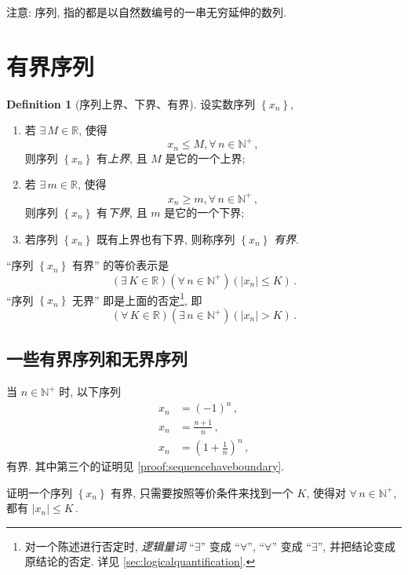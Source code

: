 \documentclass{book}
\newcommand{\Exists}{\exists\,}
\newcommand{\Any}{\forall\,}
\newcommand{\set}[1]{\left\{#1\right\}}
\newcommand{\abs}[1]{\left\lvert #1 \right\rvert}
\newcommand{\R}{\mathbb{R}}
\newcommand{\N}{\mathbb{N}}
\renewcommand{\ge}{\geqslant}
\renewcommand{\le}{\leqslant}
\numberwithin{equation}{section}
\numberwithin{figure}{section}
\theoremstyle{definition}
\newtheorem{definition}{Definition}
\newcommand{\dq}[1]{``#1''}
\begin{document}
注意: 序列, 指的都是以自然数编号的一串无穷延伸的数列.
\section{有界序列}
\begin{definition}[序列上界、下界、有界]
  设实数序列 $\set{x_n}$,
  \begin{enumerate}
    \item 若 $\Exists M\in\R$, 使得
      \begin{equation*}
	x_n\le M,\Any n\in\N^+\,,
      \end{equation*}
      则序列 $\set{x_n}$ 有\emph{上界}, 且 $M$ 是它的一个上界;
    \item 若 $\Exists m\in\R$, 使得
      \begin{equation*}
	x_n\ge m,\Any n\in\N^+\,,
      \end{equation*}
      则序列 $\set{x_n}$ 有\emph{下界}, 且 $m$ 是它的一个下界;
    \item 若序列 $\set{x_n}$ 既有上界也有下界, 则称序列 $\set{x_n}$ \emph{有界}.
  \end{enumerate}
\end{definition}

\dq{序列 $\set{x_n}$ 有界} 的等价表示是
\begin{equation*}
  (\Exists K\in\R)(\Any n\in\N^+)(\abs{x_n}\le K)\,.
\end{equation*}
\dq{序列 $\set{x_n}$ 无界} 即是上面的否定\footnote{对一个陈述进行否定时, \emph{逻辑量词} \dq{$\exists$} 变成 \dq{$\forall$}, \dq{$\forall$} 变成 \dq{$\exists$}, 并把结论变成原结论的否定. 详见 \cref{sec:logicalquantification}.}, 即
\begin{equation*}
  (\Any K\in\R)(\Exists n\in\N^+)(\abs{x_n}>K)\,.
\end{equation*}

\subsection{一些有界序列和无界序列}
\label{sec:temp:1}
当 $n\in\N^+$ 时, 以下序列
\begin{align*}
  x_n&=(-1)^n\,,\\
  x_n&=\frac{n+1}{n}\,,\\
  x_n&=\left( 1+\frac{1}{n} \right)^n\,,
\end{align*}
有界. 其中第三个的证明见 \cref{proof:sequencehaveboundary}.

证明一个序列 $\set{x_n}$ 有界, 只需要按照等价条件来找到一个 $K$, 使得对 $\Any n\in\N^+$, 都有 $\abs{x_n}\le K$\,.
\end{document}
